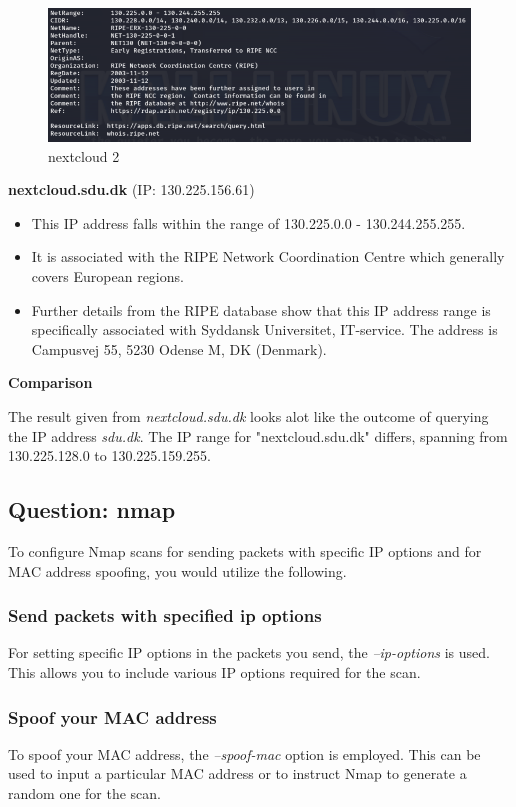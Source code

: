 \begin{figure}[H]
    \centering
    \includegraphics[width=\linewidth]{pic/nextcloud 2.png}
    \caption{nextcloud 2}
    \label{fig:nextcloud 2}
\end{figure}

\textbf{nextcloud.sdu.dk} (IP: 130.225.156.61)
\begin{itemize}
    \item This IP address falls within the range of 130.225.0.0 - 130.244.255.255.
    \item It is associated with the RIPE Network Coordination Centre which generally covers European regions.
    \item Further details from the RIPE database show that this IP address range is specifically associated with Syddansk Universitet, IT-service. The address is Campusvej 55, 5230 Odense M, DK (Denmark).
\end{itemize}

\textbf{Comparison}

The result given from \textit{nextcloud.sdu.dk} looks alot like the outcome of querying the IP address \textit{sdu.dk}.
The IP range for "nextcloud.sdu.dk" differs, spanning from 130.225.128.0 to 130.225.159.255.


\subsection{Question: nmap}
To configure Nmap scans for sending packets with specific IP options and for MAC address spoofing, you would utilize the following.

\subsubsection{Send packets with specified ip options}
For setting specific IP options in the packets you send, the \textit{--ip-options} is used. This allows you to include various IP options required for the scan.

\subsubsection{Spoof your MAC address}
To spoof your MAC address, the \textit{--spoof-mac} option is employed. This can be used to input a particular MAC address or to instruct Nmap to generate a random one for the scan.




